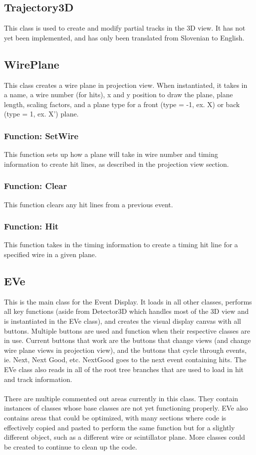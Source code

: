 \documentclass[12pt]{article}
\numberwithin{equation}{section}
\begin{document}
\subsection{Trajectory3D}
This class is used to create and modify partial tracks in the 3D view. It has not yet been implemented, and has only been translated from Slovenian to English.

\subsection{WirePlane}
This class creates a wire plane in projection view. When instantiated, it takes in a name, a wire number (for hits), x and y position to draw the plane, plane length, scaling factors, and a plane type for a front (type = -1, ex. X) or back (type = 1, ex. X') plane.

\subsubsection{Function: SetWire}
This function sets up how a plane will take in wire number and timing information to create hit lines, as described in the projection view section. 

\subsubsection{Function: Clear}
This function clears any hit lines from a previous event.

\subsubsection{Function: Hit}
This function takes in the timing information to create a timing hit line for a specified wire in a given plane. 

\subsection{EVe}
This is the main class for the Event Display. It loads in all other classes, performs all key functions (aside from Detector3D which handles most of the 3D view and is instantiated in the EVe class), and creates the visual display canvas with all buttons. Multiple buttons are used and function when their respective classes are in use. Current buttons that work are the buttons that change views (and change wire plane views in projection view), and the buttons that cycle through events, ie. Next, Next Good, etc. NextGood goes to the next event containing hits. The EVe class also reads in all of the root tree branches that are used to load in hit and track information.
\\
\\
 There are multiple commented out areas currently in this class. They contain instances of classes whose base classes are not yet functioning properly. EVe also contains areas that could be optimized, with many sections where code is effectively copied and pasted to perform the same function but for a slightly different object, such as a different wire or scintillator plane. More classes could be created to continue to clean up the code.
\end{document}
